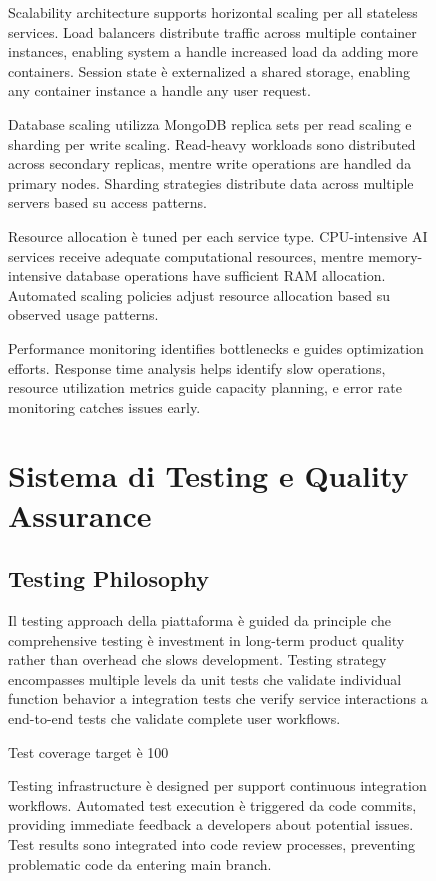 \documentclass[12pt,a4paper]{article}
\begin{document}
\begin{figure}[H]
Scalability architecture supports horizontal scaling per all stateless services. Load balancers distribute traffic across multiple container instances, enabling system a handle increased load da adding more containers. Session state è externalized a shared storage, enabling any container instance a handle any user request.

Database scaling utilizza MongoDB replica sets per read scaling e sharding per write scaling. Read-heavy workloads sono distributed across secondary replicas, mentre write operations are handled da primary nodes. Sharding strategies distribute data across multiple servers based su access patterns.

Resource allocation è tuned per each service type. CPU-intensive AI services receive adequate computational resources, mentre memory-intensive database operations have sufficient RAM allocation. Automated scaling policies adjust resource allocation based su observed usage patterns.

Performance monitoring identifies bottlenecks e guides optimization efforts. Response time analysis helps identify slow operations, resource utilization metrics guide capacity planning, e error rate monitoring catches issues early.

\section{Sistema di Testing e Quality Assurance}

\subsection{Testing Philosophy}

Il testing approach della piattaforma è guided da principle che comprehensive testing è investment in long-term product quality rather than overhead che slows development. Testing strategy encompasses multiple levels da unit tests che validate individual function behavior a integration tests che verify service interactions a end-to-end tests che validate complete user workflows.

Test coverage target è 100%

Testing infrastructure è designed per support continuous integration workflows. Automated test execution è triggered da code commits, providing immediate feedback a developers about potential issues. Test results sono integrated into code review processes, preventing problematic code da entering main branch.


\end{figure}
\end{document}

